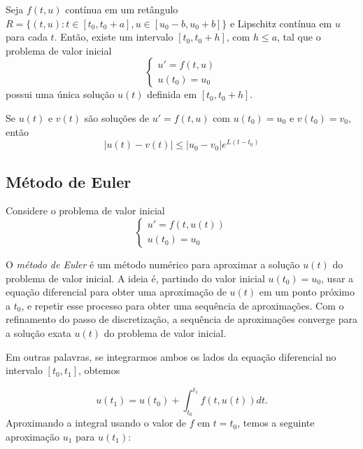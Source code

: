 \documentclass{article}
\begin{document}
\begin{thm} 
    Seja \(f(t,u)\) contínua em um retângulo \(R = \{(t,u) : t \in [t_0, t_0 + a], u \in [u_0 - b, u_0 + b]\}\) e Lipschitz contínua em \(u\) para cada \(t\). Então, existe um intervalo \([t_0, t_0 + h]\), com \(h \leq a\), tal que o problema de valor inicial
    \begin{equation}
        \begin{cases}
            u' = f(t,u) \\
            u(t_0) = u_0
        \end{cases}
    \end{equation}
    possui uma única solução \(u(t)\) definida em \([t_0, t_0 + h]\).
\end{thm}

\begin{thm}
    Se \(u(t)\) e \(v(t)\) são soluções de \(u' = f(t,u)\) com \(u(t_0) = u_0\) e \(v(t_0) = v_0\), então
    \begin{equation}
        \vert u(t) - v(t) \vert \leq \vert u_0 - v_0 \vert e^{L(t-t_0)}
    \end{equation}
\end{thm}

\subsection{Método de Euler}

Considere o problema de valor inicial
\begin{equation}
    \begin{cases}
        u' = f(t,u(t)) \\
        u(t_0) = u_0
    \end{cases}
\end{equation}

O \emph{método de Euler} é um método numérico para aproximar a solução \(u(t)\) do problema de valor inicial. A ideia é, partindo do valor inicial \(u(t_0) = u_0\), usar a equação diferencial para obter uma aproximação de \(u(t)\) em um ponto próximo a \(t_0\), e repetir esse processo para obter uma sequência de aproximações. Com o refinamento do passo de discretização, a sequência de aproximações converge para a solução exata \(u(t)\) do problema de valor inicial.

Em outras palavras, se integrarmos ambos os lados da equação diferencial no intervalo \([t_0, t_1]\), obtemos

\begin{equation}
    u(t_1) = u(t_0) + \int_{t_0}^{t_1} f(t, u(t)) dt.
\end{equation}
Aproximando a integral usando o valor de \(f\) em \(t = t_0\), temos a seguinte aproximação \(u_1\) para \(u(t_1)\):
\end{document}
